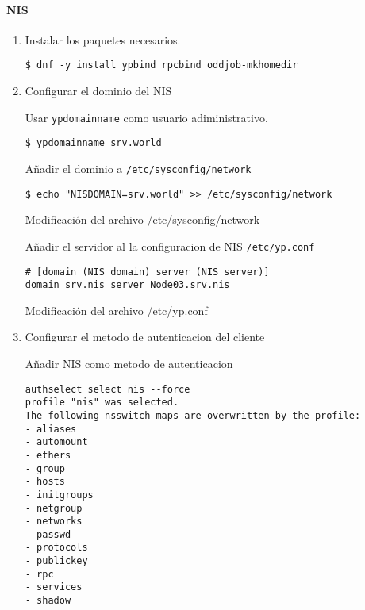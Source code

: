 \documentclass[../main.tex]{subfiles}
\begin{document}
\paragraph{NIS}
\begin{enumerate}
  \item Instalar los paquetes necesarios.
        \begin{listing}
\begin{verbatim}
$ dnf -y install ypbind rpcbind oddjob-mkhomedir
\end{verbatim}
\end{listing}

  \item Configurar el dominio del NIS

        Usar \texttt{ypdomainname} como usuario adiministrativo.
        \begin{listing}[H]
\begin{verbatim}
$ ypdomainname srv.world
\end{verbatim}
\end{listing}
        Añadir el dominio a \texttt{/etc/sysconfig/network}
        \begin{listing}[H]
\begin{verbatim}
$ echo "NISDOMAIN=srv.world" >> /etc/sysconfig/network
\end{verbatim}
\label{list:sysnetwork}
\caption{Modificación del archivo /etc/sysconfig/network}
\end{listing}
        Añadir el servidor al la configuracion de NIS \texttt{/etc/yp.conf}
        \begin{listing}[H]
\begin{verbatim}
# [domain (NIS domain) server (NIS server)]
domain srv.nis server Node03.srv.nis
\end{verbatim}
\label{list:yp}
\caption{Modificación del archivo /etc/yp.conf}
\end{listing}

  \item Configurar el metodo de autenticacion del cliente

        Añadir NIS como metodo de autenticacion

        \begin{listing}[H]
\begin{verbatim}
authselect select nis --force
profile "nis" was selected.
The following nsswitch maps are overwritten by the profile:
- aliases
- automount
- ethers
- group
- hosts
- initgroups
- netgroup
- networks
- passwd
- protocols
- publickey
- rpc
- services
- shadow


\end{verbatim}
\end{listing}
\end{enumerate}
\end{document}
